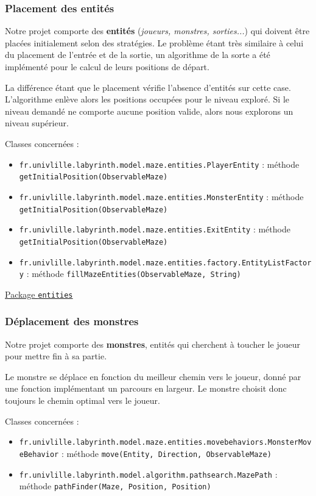 \documentclass{butexFR}
\begin{document}
\subsubsection{Placement des entités}

Notre projet comporte des \textbf{entités} (\emph{joueurs, monstres, sorties...}) qui doivent être placées initialement selon des stratégies. Le problème étant très similaire à celui du placement de l'entrée et de la sortie, un algorithme de la sorte a été implémenté pour le calcul de leurs positions de départ.

La différence étant que le placement vérifie l'absence d'entités sur cette case. L'algorithme enlève alors les positions occupées pour le niveau exploré. Si le niveau demandé ne comporte aucune position valide, alors nous explorons un niveau supérieur.

Classes concernées :
\begin{itemize}
    \item \texttt{fr.univlille.labyrinth.model.maze.entities.PlayerEntity} : méthode \texttt{getInitialPosition(ObservableMaze)}
    \item \texttt{fr.univlille.labyrinth.model.maze.entities.MonsterEntity} : méthode \texttt{getInitialPosition(ObservableMaze)}
    \item \texttt{fr.univlille.labyrinth.model.maze.entities.ExitEntity} : méthode \texttt{getInitialPosition(ObservableMaze)}
    \item \texttt{fr.univlille.labyrinth.model.maze.entities.factory.EntityListFactory} : méthode \texttt{fillMazeEntities(ObservableMaze, String)}
\end{itemize}

\href{https://gitlab.univ-lille.fr/sae302/2025/G2_SAE3.3/-/tree/master/labyrinth/src/main/java/fr/univlille/labyrinth/model/maze/entities}{Package \texttt{entities}}


\subsubsection{Déplacement des monstres}

Notre projet comporte des \textbf{monstres}, entités qui cherchent à toucher le joueur pour mettre fin à sa partie.

Le monstre se déplace en fonction du meilleur chemin vers le joueur, donné par une fonction implémentant un parcours en largeur. Le monstre choisit donc toujours le chemin optimal vers le joueur.

Classes concernées :
\begin{itemize}
    \item \texttt{fr.univlille.labyrinth.model.maze.entities.movebehaviors.MonsterMoveBehavior} : méthode \texttt{move(Entity, Direction, ObservableMaze)}
    \item \texttt{fr.univlille.labyrinth.model.algorithm.pathsearch.MazePath} : méthode \texttt{pathFinder(Maze, Position, Position)}
\end{itemize}
\end{document}
